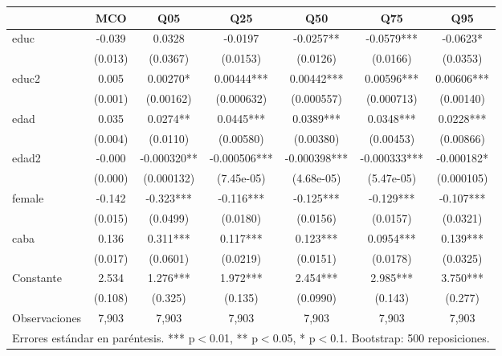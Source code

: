 {\begin{tabular}{lcccccc} 
		\hline \hline
		& \textbf{MCO} & \textbf{Q05} & \textbf{Q25} & \textbf{Q50} & \textbf{Q75} & \textbf{Q95} \\ \hline
		educ & -0.039\sym{***} & 0.0328 & -0.0197 & -0.0257** & -0.0579*** & -0.0623* \\
		 & (0.013) & (0.0367) & (0.0153) & (0.0126) & (0.0166) & (0.0353) \\
		educ2 & 0.005\sym{***} &  0.00270* & 0.00444*** & 0.00442*** & 0.00596*** & 0.00606*** \\
		&(0.001)& (0.00162) & (0.000632) & (0.000557) & (0.000713) & (0.00140) \\
		edad & 0.035\sym{***}& 0.0274** & 0.0445*** & 0.0389*** & 0.0348*** & 0.0228*** \\
		&(0.004)  & (0.0110) & (0.00580) & (0.00380) & (0.00453) & (0.00866) \\
		edad2 & -0.000\sym{***} & -0.000320** & -0.000506*** & -0.000398*** & -0.000333*** & -0.000182* \\
		& (0.000) & (0.000132) & (7.45e-05) & (4.68e-05) & (5.47e-05) & (0.000105) \\
		female & -0.142\sym{***} & -0.323*** & -0.116*** & -0.125*** & -0.129*** & -0.107*** \\
		& (0.015) & (0.0499) & (0.0180) & (0.0156) & (0.0157) & (0.0321) \\
		caba & 0.136\sym{***} & 0.311*** & 0.117*** & 0.123*** & 0.0954*** & 0.139*** \\
		&(0.017) & (0.0601) & (0.0219) & (0.0151) & (0.0178) & (0.0325) \\
		Constante & 2.534\sym{***} & 1.276*** & 1.972*** & 2.454*** & 2.985*** & 3.750*** \\
		& (0.108)  & (0.325) & (0.135) & (0.0990) & (0.143) & (0.277) \\
		Observaciones & 7,903 & 7,903 & 7,903 & 7,903 & 7,903 & 7,903 \\ \hline
		\multicolumn{7}{c}{\small{Errores estándar en paréntesis. *** p$<$0.01, ** p$<$0.05, * p$<$0.1. Bootstrap: 500 reposiciones.}} \\
	\end{tabular}
}
